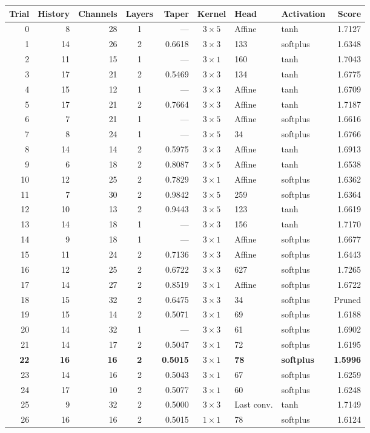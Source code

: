 \begin{tabular}{@{}rrrcrcllr@{}}
\toprule
Trial & History & Channels & Layers & Taper & Kernel & Head & Activation & Score \\
\midrule
0 & 8 & 28 & 1 & --- & \(3\times5\) & Affine & tanh & 1.7127 \\
1 & 14 & 26 & 2 & 0.6618 & \(3\times3\) & 133 & softplus & 1.6348 \\
2 & 11 & 15 & 1 & --- & \(3\times1\) & 160 & tanh & 1.7043 \\
3 & 17 & 21 & 2 & 0.5469 & \(3\times3\) & 134 & tanh & 1.6775 \\
4 & 15 & 12 & 1 & --- & \(3\times3\) & Affine & tanh & 1.6709 \\
5 & 17 & 21 & 2 & 0.7664 & \(3\times3\) & Affine & tanh & 1.7187 \\
6 & 7 & 21 & 1 & --- & \(3\times5\) & Affine & softplus & 1.6616 \\
7 & 8 & 24 & 1 & --- & \(3\times5\) & 34 & softplus & 1.6766 \\
8 & 14 & 14 & 2 & 0.5975 & \(3\times3\) & Affine & tanh & 1.6913 \\
9 & 6 & 18 & 2 & 0.8087 & \(3\times5\) & Affine & tanh & 1.6538 \\
10 & 12 & 25 & 2 & 0.7829 & \(3\times1\) & Affine & softplus & 1.6362 \\
11 & 7 & 30 & 2 & 0.9842 & \(3\times5\) & 259 & softplus & 1.6364 \\
12 & 10 & 13 & 2 & 0.9443 & \(3\times5\) & 123 & tanh & 1.6619 \\
13 & 14 & 18 & 1 & --- & \(3\times3\) & 156 & tanh & 1.7170 \\
14 & 9 & 18 & 1 & --- & \(3\times1\) & Affine & softplus & 1.6677 \\
15 & 11 & 24 & 2 & 0.7136 & \(3\times3\) & Affine & softplus & 1.6443 \\
16 & 12 & 25 & 2 & 0.6722 & \(3\times3\) & 627 & softplus & 1.7265 \\
17 & 14 & 27 & 2 & 0.8519 & \(3\times1\) & Affine & softplus & 1.6722 \\
18 & 15 & 32 & 2 & 0.6475 & \(3\times3\) & 34 & softplus & Pruned \\
19 & 15 & 14 & 2 & 0.5071 & \(3\times1\) & 69 & softplus & 1.6188 \\
20 & 14 & 32 & 1 & --- & \(3\times3\) & 61 & softplus & 1.6902 \\
21 & 14 & 17 & 2 & 0.5047 & \(3\times1\) & 72 & softplus & 1.6195 \\
\textbf{22} & \textbf{16} & \textbf{16} & \textbf{2} & \textbf{0.5015} & \textbf{\(3\times1\)} & \textbf{78} & \textbf{softplus} & \textbf{1.5996} \\
23 & 14 & 16 & 2 & 0.5043 & \(3\times1\) & 67 & softplus & 1.6259 \\
24 & 17 & 10 & 2 & 0.5077 & \(3\times1\) & 60 & softplus & 1.6248 \\
25 & 9 & 32 & 2 & 0.5000 & \(3\times3\) & Last conv. & tanh & 1.7149 \\
26 & 16 & 16 & 2 & 0.5015 & \(1\times1\) & 78 & softplus & 1.6124 \\
\bottomrule
\end{tabular}
